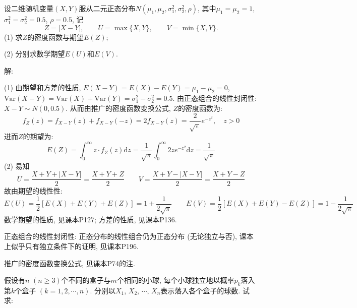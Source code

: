 \documentclass[standard]{ExBook}
\begin{document}
\begin{qitems}
\vspace{-5em}

    \begin{bbox}
    \begin{shaded}
        \qitem
设二维随机变量$(X,Y)$服从二元正态分布$N(\mu_1,\mu_2,\sigma_1^2,\sigma_2^2,\rho)$, 其中$\mu_1=\mu_2=1$, $\sigma_1^2=\sigma_2^2=0.5$, $\rho=0.5$, 记
$$Z=|X-Y|,\qquad U=\max\{X,Y\},\qquad V=\min\{X,Y\}.$$
(1) 求$Z$的密度函数与期望$E(Z)$;

(2) 分别求数学期望$E(U)$和$E(V)$.
    \end{shaded}
    \end{bbox}

\vspace{-5em}

    \begin{bbox}
解: 

(1) 由期望和方差的性质, $E(X-Y)=E(X)-E(Y)=\mu_1-\mu_2=0$, $\mathrm{Var}(X-Y)=\mathrm{Var}(X)+\mathrm{Var}(Y)=\sigma_1^2-\sigma_2^2=0.5$. 由正态组合的线性封闭性: $X-Y\sim N(0,0.5)$. 从而由推广的密度函数变换公式, $Z$的密度函数为:
$$f_{Z}(z)=f_{X-Y}(z)+f_{X-Y}(-z)=2f_{X-Y}(z)=\frac{2}{\sqrt{\pi}}e^{-z^2},\quad z>0$$
进而$Z$的期望为:
$$E(Z)=\displaystyle\int_{0}^{\infty}z\cdot f_{Z}(z)\mathrm{d}z=\frac{1}{\sqrt{\pi}}\int_{0}^{\infty}2z e^{-z^2}\mathrm{d}z=\frac{1}{\sqrt{\pi}}$$
(2) 易知
$$U=\displaystyle\frac{X+Y+|X-Y|}{2}=\frac{X+Y+Z}{2} \qquad V=\frac{X+Y-|X-Y|}{2}=\frac{X+Y-Z}{2}$$
故由期望的线性性:
$$E(U)=\frac{1}{2}\left[E(X)+E(Y)+E(Z)\right]=1+\frac{1}{2\sqrt{\pi}} \qquad E(V)=\frac{1}{2}\left[E(X)+E(Y)-E(Z)\right]=1-\frac{1}{2\sqrt{\pi}}$$
\textcolor{themeColor}{\selectfont {} 数学期望的性质, 见课本P127; 方差的性质, 见课本P136.}

\textcolor{themeColor}{\selectfont {} 正态组合的线性封闭性: 正态分布的线性组合仍为正态分布 (无论独立与否), 课本上似乎只有独立条件下的证明, 见课本P196.}
    \end{bbox}

\vspace{-5em}

    \begin{bbox}
\textcolor{themeColor}{\selectfont {} 推广的密度函数变换公式, 见课本P74的注.}
    \end{bbox}

\vspace{-5em}

    \begin{bbox}
    \begin{shaded}
        \qitem
假设有$n$ $(n\geq 3)$个不同的盒子与$m$个相同的小球, 每个小球独立地以概率$p_k$落入第$k$个盒子 $(k=1,2,\cdots,n)$. 分别以$X_1$, $X_2$, $\cdots$, $X_n$表示落入各个盒子的球数. 试求:


\end{shaded}
\end{bbox}
\end{qitems}
\end{document}
